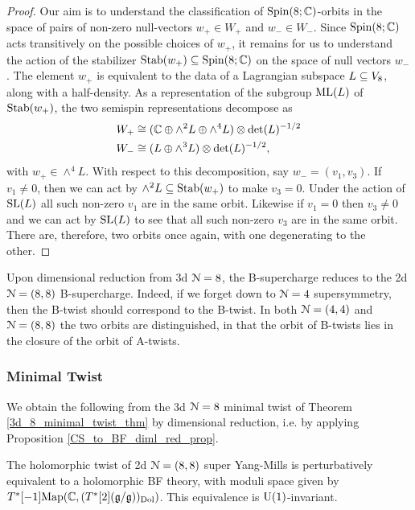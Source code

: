 \documentclass[10pt, oneside]{article}
\begin{document}
\begin{proof}
Our aim is to understand the classification of $\mathrm{Spin}(8;\mathbb C)$-orbits in the space of pairs of non-zero null-vectors $w_+ \in W_+$ and $w_- \in W_-$.  Since $\mathrm{Spin}(8;\mathbb C)$ acts transitively on the possible choices of $w_+$, it remains for us to understand the action of the stabilizer $\operatorname{Stab}(w_+) \subseteq \mathrm{Spin}(8;\mathbb C)$ on the space of null vectors $w_-$.  The element $w_+$ is equivalent to the data of a Lagrangian subspace $L \subseteq V_8$, along with a half-density.  As a representation of the subgroup $\mathrm{ML}(L)$ of $\operatorname{Stab}(w_+)$, the two semispin representations decompose as
\begin{align*}
 W_+ &\cong (\mathbb C \oplus \wedge^2 L \oplus \wedge^4 L) \otimes \det(L)^{-1/2} \\
 W_- &\cong (L \oplus \wedge^3 L) \otimes \det(L)^{-1/2},
\end{align*}
with $w_+ \in \wedge^4 L$.  With respect to this decomposition, say $w_- = (v_1,v_3)$.  If $v_1 \ne 0$, then we can act by $\wedge^2 L \subseteq \operatorname{Stab}(w_+)$ to make $v_3 = 0$.  Under the action of $\mathrm{SL}(L)$ all such non-zero $v_1$ are in the same orbit.  Likewise if $v_1 = 0$ then $v_3 \ne 0$ and we can act by $\mathrm{SL}(L)$ to see that all such non-zero $v_3$ are in the same orbit.  There are, therefore, two orbits once again, with one degenerating to the other.
\end{proof}

Upon dimensional reduction from 3d $\mathcal{N}=8$, the B-supercharge reduces to the 2d $\mathcal{N}=(8,8)$ B-supercharge.  Indeed, if we forget down to $\mathcal{N}=4$ supersymmetry, then the B-twist should correspond to the B-twist.  In both $\mathcal{N}=(4,4)$ and $\mathcal{N}=(8,8)$ the two orbits are distinguished, in that the orbit of B-twists lies in the closure of the orbit of A-twists.

\subsubsection{Minimal Twist} \label{sect:2d88minimaltwist}
We obtain the following from the 3d $\mathcal{N}=8$ minimal twist of Theorem \ref{3d_8_minimal_twist_thm} by dimensional reduction, i.e. by applying Proposition \ref{CS_to_BF_diml_red_prop}.

\begin{theorem}
The holomorphic twist of 2d $\mathcal{N}=(8,8)$ super Yang-Mills is perturbatively equivalent to a holomorphic BF theory, with moduli space given by $T^*[-1]\mathrm{Map}(\mathbb C, (T^*[2](\mathfrak{g} / \mathfrak{g}))_{\mathrm{Dol}})$. This equivalence is $\mathrm{U}(1)$-invariant.
\end{theorem}
\end{document}
